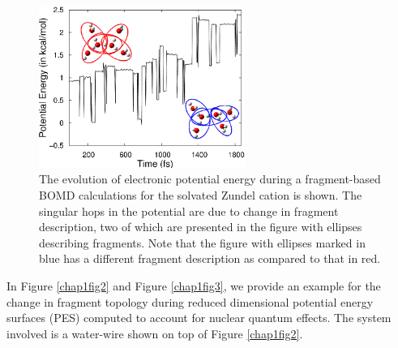\begin{figure}[H]
  \begin{center}
    \includegraphics[width=0.6\textwidth]{figures/bomdEnergy.eps}
    \caption{\label{chap1fig1} The evolution of electronic potential energy during a
    fragment-based BOMD calculations for the solvated Zundel cation is shown. The singular
    hops in the potential are due to change in fragment description, two of which
    are presented in the figure with ellipses describing fragments. Note that the
    figure with ellipses marked in blue has a different fragment description as
    compared to that in red.}
  \end{center}
\end{figure}

In Figure \ref{chap1fig2} and Figure \ref{chap1fig3}, we provide an example for
the change in fragment topology
during reduced dimensional potential energy surfaces (PES) computed to account for
nuclear quantum effects. The system involved is a water-wire shown on top of Figure
\ref{chap1fig2}.

